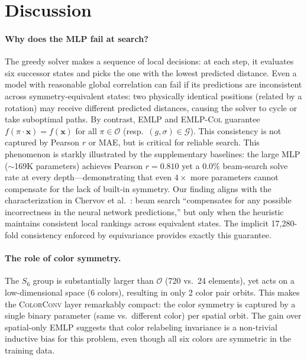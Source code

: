 \documentclass[11pt]{article}
\newcommand{\bx}{\mathbf{x}}
\begin{document}
\section{Discussion}
\label{sec:discussion}

\paragraph{Why does the MLP fail at search?}
The greedy solver makes a sequence of local decisions: at each step, it
evaluates six successor states and picks the one with the lowest predicted
distance.
Even a model with reasonable global correlation can fail if its predictions
are inconsistent across symmetry-equivalent states: two physically identical
positions (related by a rotation) may receive different predicted distances,
causing the solver to cycle or take suboptimal paths.
By contrast, \textsc{EMLP} and \textsc{EMLP-Col} guarantee
$f(\pi \cdot \bx) = f(\bx)$ for all $\pi \in \mathcal{O}$ (resp.\
$(g, \sigma) \in \mathcal{G}$).
This consistency is not captured by Pearson $r$ or MAE, but is critical for
reliable search.
This phenomenon is starkly illustrated by the supplementary baselines:
the large \textsc{MLP} (${\sim}$169K parameters) achieves Pearson $r = 0.810$
yet a 0.0\% beam-search solve rate at every depth—demonstrating that even
$4\times$ more parameters cannot compensate for the lack of built-in symmetry.
Our finding aligns with the characterization in Chervov et al.\
\cite{chervov2025cayleypy}: beam search ``compensates for any possible
incorrectness in the neural network predictions,'' but only when the
heuristic maintains consistent local rankings across equivalent states.
The implicit 17,280-fold consistency enforced by equivariance provides exactly
this guarantee.

\paragraph{The role of color symmetry.}
The $S_6$ group is substantially larger than $\mathcal{O}$ (720 vs.\ 24
elements), yet acts on a low-dimensional space (6 colors), resulting in
only 2 color pair orbits.
This makes the \textsc{ColorConv} layer remarkably compact: the color
symmetry is captured by a single binary parameter (same vs.\ different color)
per spatial orbit.
The gain over spatial-only \textsc{EMLP} suggests that color relabeling
invariance is a non-trivial inductive bias for this problem, even though
all six colors are symmetric in the training data.
\end{document}
